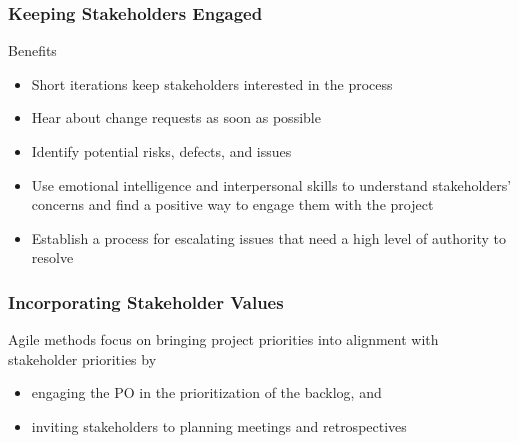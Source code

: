 \documentclass[letterpaper,10pt,english]{jupyterBook}
\begin{document}
\subsubsection{Keeping Stakeholders Engaged}
\label{\detokenize{APM/agile:keeping-stakeholders-engaged}}
\sphinxAtStartPar
Benefits
\begin{itemize}
\item {} 
\sphinxAtStartPar
Short iterations keep stakeholders interested in the process

\item {} 
\sphinxAtStartPar
Hear about change requests as soon as possible

\item {} 
\sphinxAtStartPar
Identify potential risks, defects, and issues

\item {} 
\sphinxAtStartPar
Use emotional intelligence and interpersonal skills to understand stakeholders’ concerns and find a positive way to engage them with the project

\item {} 
\sphinxAtStartPar
Establish a process for escalating issues that need a high level of authority to resolve

\end{itemize}


\subsubsection{Incorporating Stakeholder Values}
\label{\detokenize{APM/agile:incorporating-stakeholder-values}}
\sphinxAtStartPar
Agile methods focus on bringing project priorities into alignment with stakeholder priorities by
\begin{itemize}
\item {} 
\sphinxAtStartPar
engaging the PO in the prioritization of the backlog, and

\item {} 
\sphinxAtStartPar
inviting stakeholders to planning meetings and retrospectives

\end{itemize}
\end{document}
